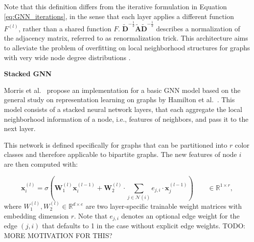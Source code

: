 Note that this definition differs from the iterative formulation in Equation \ref{eq:GNN_iterations}, in the sense that each layer applies a different function $F^{(l)}$, rather than a shared function $F$. $\tilde{\mathbf{D}}^{-\frac{1}{2}}\tilde{\mathbf{A}}\tilde{\mathbf{D}}^{-\frac{1}{2}}$ describes a normalization of the adjacency matrix, referred to as renormalization trick. This architecture aims to alleviate the problem of overfitting on local neighborhood structures for graphs with very wide node degree distributions \cite{kipf2016semi}. \bigskip


\textbf{Stacked GNN} \par
Morris et al.~\cite{morris2019weisfeiler} propose an implementation for a basic GNN model based on the general study on representation learning on graphs by Hamilton et al.~\cite{hamilton2017representation}. This model consists of a stacked neural network layers, that each aggregate the local neighborhood information of a node, i.e., features of neighbors, and pass it to the next layer.

This network is defined specifically for graphs that can be partitioned into $r$ color classes and therefore applicable to bipartite graphs. The new features of node $i$ are then computed with:

\begin{equation}
    \label{eq:higher-order-gnn}
    \mathbf{x}_i^{(l)} = \sigma(\mathbf{W}_1^{(l)}\mathbf{x}_i^{(l-1)}+\mathbf{W}_2^{(l)}\cdot\sum_{j\in\mathcal{N}(i)}e_{j,i}\cdot \mathbf{x}_j^{(l-1)}) \qquad \in \mathbb{R}^{1\times r},
\end{equation}
where $W_1^{(l)}, W_2^{(l)} \in \mathbb{R}^{d\times e}$ are two layer-specific trainable weight matrices with embedding dimension $r$. Note that $e_{j,i}$ denotes an optional edge weight for the edge $(j,i)$ that defaults to 1 in the case without explicit edge weights. 
TODO: MORE MOTIVATION FOR THIS? \bigskip

